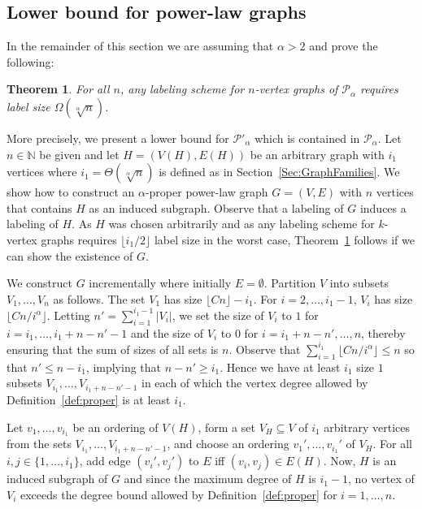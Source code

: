 \documentclass{article}
\newtheorem{theorem}{Theorem}
\theoremstyle{remark}
\newcommand{\PLB}{\ensuremath{ \mathcal{P}_{\alpha}}}
\newcommand{\PLC}{\ensuremath{ \mathcal{P}'_{\alpha}}}
\begin{document}
\subsection{Lower bound for power-law graphs}
In the remainder of this section we are assuming that $\alpha>2$ and  prove the following:
\begin{theorem}\label{centralLowerBound}
For all $n$, any labeling scheme for $n$-vertex graphs of $\PLB$ requires label size $\Omega(\sqrt[\alpha]{n})$.
\end{theorem}
More precisely, we present a lower bound for $\PLC$ which is contained in $\PLB$. Let $n\in\mathbb N$ be given and let $H = (V(H),E(H))$ be an arbitrary graph with $i_1$ vertices where $i_1 = \Theta(\sqrt[\alpha]n)$ is defined as in Section~\ref{Sec:GraphFamilies}. We show how to construct an $\alpha$-proper power-law graph $G = (V,E)$ with $n$ vertices that contains $H$ as an induced subgraph. Observe that a labeling of $G$ induces a labeling of $H$. As $H$ was chosen arbitrarily and as any labeling scheme for $k$-vertex graphs requires $\lfloor i_1/2 \rfloor$ label size in the worst case, Theorem~\ref{centralLowerBound} follows if we can show the existence of $G$.

We construct $G$ incrementally where initially $E = \emptyset$. Partition $V$ into subsets $V_1,\ldots,V_n$ as follows. The set $V_1$ has size $\lfloor Cn\rfloor - i_1$. For $i = 2,\ldots,i_1-1$, $V_i$ has size $\lfloor Cn/i^\alpha\rfloor$. Letting $n' = \sum_{i = 1}^{i_1-1} \vert V_i\vert$, we set the size of $V_i$ to $1$ for $i = i_1,\ldots,i_1+n-n'-1$ and the size of $V_i$ to $0$ for $i = i_1+n-n',\ldots,n$, thereby ensuring that the sum of sizes of all sets is $n$. Observe that $\sum_{i = 1}^{i_1}\lfloor Cn/i^\alpha\rfloor\leq n$ so that $n'\leq n - i_1$, implying that $n-n'\geq i_1$. Hence we have at least $i_1$ size $1$ subsets $V_{i_1},\ldots,V_{i_1+n-n'-1}$ in each of which the vertex degree allowed by Definition~\ref{def:proper} is at least $i_1$.

Let $v_1,\ldots,v_{i_1}$ be an ordering of $V(H)$, form a set $V_H\subseteq V$ of $i_1$ arbitrary vertices from the sets $V_{i_1},\ldots,V_{i_1+n-n'-1}$, and choose an ordering $v_1',\ldots,v_{i_1}'$ of $V_H$. For all $i,j\in\{1,\ldots,i_1\}$, add edge $(v_i',v_j')$ to $E$ iff $(v_i,v_j)\in E(H)$. Now, $H$ is an induced subgraph of $G$ and since the maximum degree of $H$ is $i_1-1$, no vertex of $V_i$ exceeds the degree bound allowed by Definition~\ref{def:proper} for $i = 1,\ldots,n$.
\end{document}
